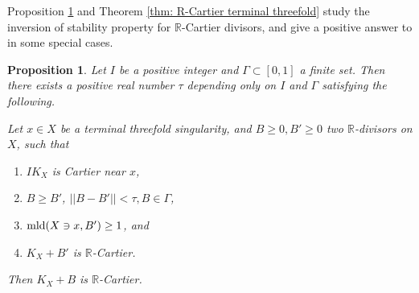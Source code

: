 \documentclass[11pt]{amsart}
\numberwithin{equation}{section}
\newcommand{\Rr}{\mathbb{R}}
\newcommand{\mld}{{\rm{mld}}}
\newcommand{\Ii}{{\Gamma}}
\newtheorem{prop}[thm]{Proposition}
\theoremstyle{definition}
\theoremstyle{definition}
\begin{document}
Proposition \ref{prop: I R-Cartier terminal threefold} and Theorem \ref{thm: R-Cartier terminal threefold} study the inversion of stability property for $\Rr$-Cartier divisors, and give a positive answer to \cite[Conjecture 7.8]{HL20} in some special cases.

\begin{prop}\label{prop: I R-Cartier terminal threefold}
	Let $I$ be a positive integer and $\Ii\subset [0,1]$ a finite set. Then there exists a positive real number $\tau$ depending only on $I$ and $\Ii$ satisfying the following. 
	
	Let $x\in X$ be a terminal threefold singularity, and $B\ge0,B'\ge0$ two $\Rr$-divisors on $X$, such that 
	\begin{enumerate}
	\item $IK_X$ is Cartier near $x$,
	    \item $B\geq B'$,  $||B-B'||<\tau,B\in\Ii$,
	    \item $\mld(X\ni x,B')\ge 1$,
	    and
	    \item $K_X+B'$ is $\Rr$-Cartier.
	\end{enumerate}
	Then $K_X+B$ is $\Rr$-Cartier.
\end{prop}

\end{document}

